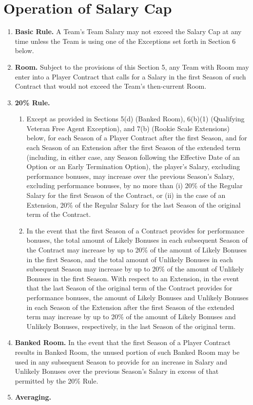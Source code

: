 \documentclass[
]{book}
\providecommand{\tightlist}{%
  \setlength{\itemsep}{0pt}\setlength{\parskip}{0pt}}
\begin{document}
\hypertarget{operation-of-salary-cap}{%
\section{Operation of Salary Cap}\label{operation-of-salary-cap}}

\begin{enumerate}
\def\labelenumi{(\alph{enumi})}
\tightlist
\item
  \textbf{Basic Rule.} A Team's Team Salary may not exceed the Salary Cap at any time unless the Team is using one of the Exceptions set forth in Section 6 below.
\item
  \textbf{Room.} Subject to the provisions of this Section 5, any Team with Room may enter into a Player Contract that calls for a Salary in the first Season of such Contract that would not exceed the Team's then-current Room.
\item
  \textbf{20\% Rule.}

  \begin{enumerate}
  \def\labelenumii{(\arabic{enumii})}
  \tightlist
  \item
    Except as provided in Sections 5(d) (Banked Room), 6(b)(1) (Qualifying Veteran Free Agent Exception), and 7(b) (Rookie Scale Extensions) below, for each Season of a Player Contract after the first Season, and for each Season of an Extension after the first Season of the extended term (including, in either case, any Season following the Effective Date of an Option or an Early Termination Option), the player's Salary, excluding performance bonuses, may increase over the previous Season's Salary, excluding performance bonuses, by no more than (i) 20\% of the Regular Salary for the first Season of the Contract, or (ii) in the case of an Extension, 20\% of the Regular Salary for the last Season of the original term of the Contract.
  \item
    In the event that the first Season of a Contract provides for performance bonuses, the total amount of Likely Bonuses in each subsequent Season of the Contract may increase by up to 20\% of the amount of Likely Bonuses in the first Season, and the total amount of Unlikely Bonuses in each subsequent Season may increase by up to 20\% of the amount of Unlikely Bonuses in the first Season. With respect to an Extension, in the event that the last Season of the original term of the Contract provides for performance bonuses, the amount of Likely Bonuses and Unlikely Bonuses in each Season of the Extension after the first Season of the extended term may increase by up to 20\% of the amount of Likely Bonuses and Unlikely Bonuses, respectively, in the last Season of the original term.
  \end{enumerate}
\item
  \textbf{Banked Room.} In the event that the first Season of a Player Contract results in Banked Room, the unused portion of such Banked Room may be used in any subsequent Season to provide for an increase in Salary and Unlikely Bonuses over the previous Season's Salary in excess of that permitted by the 20\% Rule.
\item
  \textbf{Averaging.}


\end{enumerate}
\end{document}
